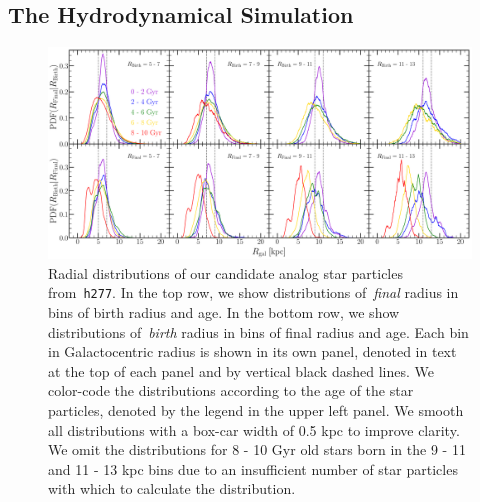 \documentclass[fleqn, usenatbib]{mnras}
\begin{document}
\subsection{The Hydrodynamical Simulation} 
\label{sec:methods:h277} 

\begin{figure} 
\centering 
\includegraphics[scale = 0.32]{decomposition.pdf} 
\caption{Radial distributions of our candidate analog star particles 
from~\texttt{h277}. In the top row, we show distributions of~\textit{final} 
radius in bins of birth radius and age. In the bottom row, we show 
distributions of~\textit{birth} radius in bins of final radius and age. Each 
bin in Galactocentric radius is shown in its own panel, denoted in text at the 
top of each panel and by vertical black dashed lines. We color-code the 
distributions according to the age of the star particles, denoted by the 
legend in the upper left panel. We smooth all distributions with a box-car 
width of 0.5 kpc to improve clarity. We omit the distributions for 8 - 10 Gyr 
old stars born in the 9 - 11 and 11 - 13 kpc bins due to an insufficient 
number of star particles with which to calculate the distribution. }
\label{fig:h277_decomposition} 
\end{figure} 
\end{document}
